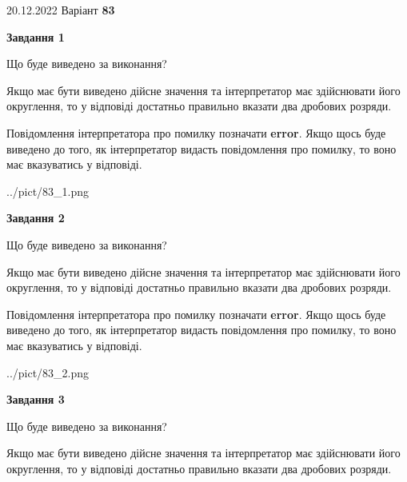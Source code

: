 \documentclass[12pt, ukrainian]{article}
\begin{document}
{20.12.2022 Варіант \No \textbf { 83 }\par}
{
\begin {Large}

{\begin {center}\textbf{Завдання 1}\end {center}}\par
Що буде виведено за виконання? \par

Якщо має бути виведено дійсне значення та інтерпретатор має здійснювати його округлення, 
то у відповіді достатньо правильно вказати два дробових розряди.

Повідомлення інтерпретатора про помилку позначати \textbf{error}.
Якщо щось буде виведено до того, як інтерпретатор видасть повідомлення про помилку, 
то воно має вказуватись у відповіді. \par

\begin{center}
	{../pict/83_1.png}
\end{center}
\newpage

{\begin {center}\textbf{Завдання 2}\end {center}}\par
Що буде виведено за виконання? \par

Якщо має бути виведено дійсне значення та інтерпретатор має здійснювати його округлення, 
то у відповіді достатньо правильно вказати два дробових розряди.

Повідомлення інтерпретатора про помилку позначати \textbf{error}.
Якщо щось буде виведено до того, як інтерпретатор видасть повідомлення про помилку, 
то воно має вказуватись у відповіді. \par

\begin{center}
	{../pict/83_2.png}
\end{center}
\newpage

{\begin {center}\textbf{Завдання 3}\end {center}}\par
Що буде виведено за виконання? \par

Якщо має бути виведено дійсне значення та інтерпретатор має здійснювати його округлення, 
то у відповіді достатньо правильно вказати два дробових розряди.


\end{Large}}
\end{document}
